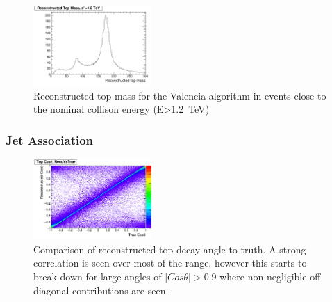 \begin{figure}
  \centering
  \includegraphics[width=0.4\textwidth]{figures/TopMass_EOver1200.png}
  \caption[Performance of Valencia algorithm for high energy events]{Reconstructed top mass for the Valencia algorithm in events close to the nominal collison energy (E>1.2~TeV)}
  \label{fig:highEValencia}
\end{figure}


\subsubsection{Jet Association}

\begin{figure}
  \centering
  \includegraphics[width=0.4\textwidth]{figures/CosThetaRecoVsMC.png}
  \caption[Comparison of reconstructed top decay angle to truth]{Comparison of reconstructed top decay angle to truth. A strong correlation is seen over most of the range, however this starts to break down for large angles of $\mid Cos\theta \mid>0.9$ where non-negligible off diagonal contributions are seen.}
  \label{fig:2djetangle}
\end{figure}

